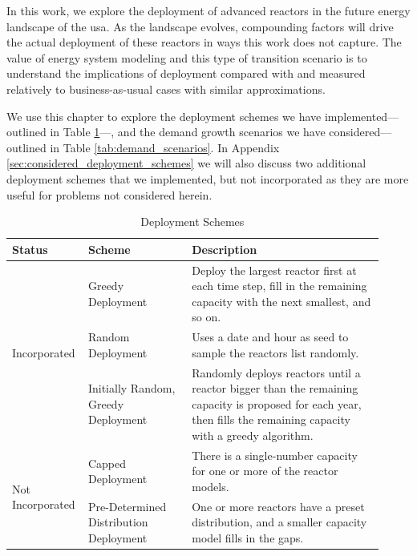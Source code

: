 In this work, we explore the deployment of advanced reactors in the future
energy landscape of the \gls{usa}. As the landscape evolves, compounding
factors will drive the actual deployment of these reactors in ways this work
does not capture. The value of energy system modeling and this type of
transition scenario is to understand the implications of deployment compared
with and measured relatively to business-as-usual cases with similar
approximations.

We use this chapter to explore the deployment schemes we have
implemented---outlined in Table \ref{tab:deployment_schemes}---, and the demand
growth scenarios we have considered---outlined in Table
\ref{tab:demand_scenarios}. In Appendix \ref{sec:considered_deployment_schemes}
we will also discuss two additional deployment schemes that we implemented, but
not incorporated as they are more useful for problems not considered herein.

\begin{table}[htbp]
    \centering
    \caption{Deployment Schemes}
    \label{tab:deployment_schemes}
    \begin{tabular}{p{0.15\linewidth} p{0.27\linewidth} p{0.50\linewidth}}
        \hline
        \textbf{Status} & \textbf{Scheme} & \textbf{Description} \\
        \hline
        \multirow{3}{*}{Incorporated} & Greedy Deployment & Deploy the largest
        reactor first at each time step, fill in the remaining capacity with
        the next smallest, and so on. \\
        & Random Deployment & Uses a date and hour as seed to sample the
        reactors list randomly. \\
        & Initially Random, Greedy Deployment & Randomly deploys reactors until
        a reactor bigger than the remaining capacity is proposed for each year,
        then fills the remaining capacity with a greedy algorithm. \\
        \hline
        \multirow{2}{*}{Not Incorporated} & Capped Deployment & There is a
        single-number capacity for one or more of the reactor models. \\
        & Pre-Determined Distribution Deployment & One or more reactors have a
        preset distribution, and a smaller capacity model fills in the gaps. \\
        \hline
    \end{tabular}
\end{table}

